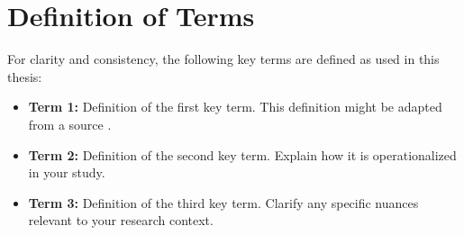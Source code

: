 \section{Definition of Terms}

For clarity and consistency, the following key terms are defined as used in this thesis:

\begin{itemize}
  \item \textbf{Term 1:} Definition of the first key term. This definition might be adapted from a source \parencite{placeholderBook2023}.
  \item \textbf{Term 2:} Definition of the second key term. Explain how it is operationalized in your study.
  \item \textbf{Term 3:} Definition of the third key term. Clarify any specific nuances relevant to your research context.
\end{itemize}
